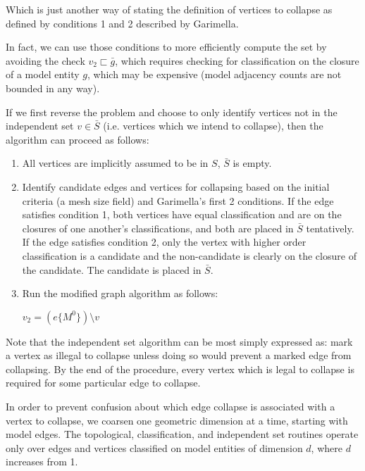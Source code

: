 \documentclass{article}
\begin{document}
Which is just another way of stating the definition of vertices to
collapse as defined by conditions 1 and 2
described by Garimella.

In fact, we can use those conditions to more efficiently compute the
set by avoiding the check $v_2\sqsubset\bar{g}$, which requires checking
for classification on the closure of a model entity $g$, which may be
expensive (model adjacency counts are not bounded in any way).

If we first reverse the problem and choose to only identify vertices
not in the independent set $v\in\bar{S}$ (i.e. vertices which we intend to collapse),
then the algorithm can proceed as follows:
\begin{enumerate}

\item All vertices are implicitly assumed to be in $S$, $\bar{S}$ is empty.

\item Identify candidate edges and vertices for collapsing based on the initial
criteria (a mesh size field) and Garimella's first 2 conditions.
If the edge satisfies condition 1, both vertices have equal classification and are on the closures
of one another's classifications, and both are placed in $\bar{S}$ tentatively.
If the edge satisfies condition 2, only the vertex with higher order classification
is a candidate and the non-candidate is clearly on the closure of the candidate.
The candidate is placed in $\bar{S}$.

\item Run the modified graph algorithm as follows:
\begin{algorithmic}
\State $v_2 = (e\{M^0\})\setminus v$
\EndIf
\EndIf
\EndFor
\EndFor
\EndFor
\end{algorithmic}
\end{enumerate}

Note that the independent set algorithm can be most simply expressed as:
mark a vertex as illegal to collapse unless doing so would prevent a marked
edge from collapsing.
By the end of the procedure, every vertex which is legal to collapse is required
for some particular edge to collapse.

In order to prevent confusion about which edge collapse is associated with a vertex
to collapse, we coarsen one geometric dimension at a time, starting with model edges.
The topological, classification, and independent set routines operate only over
edges and vertices classified on model entities of dimension $d$, where $d$ increases from 1.
\end{document}
